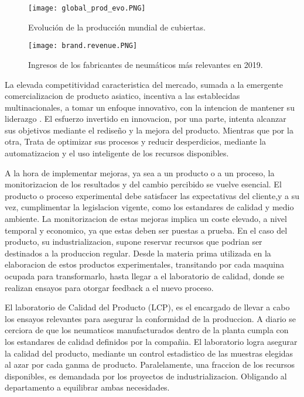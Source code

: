 \begin{figure}[h]
	\begin{center}
		\texttt{[image: global\_prod\_evo.PNG]}
	\end{center}
	\caption{Evolución de la producción mundial de cubiertas.}
	\label{fig:global_prod_evo}
\end{figure}

 \begin{figure}[h]
	\begin{center}
		\texttt{[image: brand.revenue.PNG]}
	\end{center}
	\caption{Ingresos de los fabricantes de neumáticos más relevantes en 2019.}
	\label{fig:brand_revenue}
\end{figure}

La elevada competitividad caracteristica del mercado,
sumada a la emergente comercializacion de producto asiatico,
incentiva a las establecidas multinacionales, a tomar un enfoque innovativo,
con la intencion de mantener su liderazgo \citep{chicu2020current}.
El esfuerzo invertido en innovacion,
por una parte, intenta alcanzar sus objetivos
mediante el rediseño y la mejora del producto.
Mientras que por la otra,
Trata de optimizar sus procesos y reducir desperdicios,
mediante la automatizacion y el uso inteligente de los recursos disponibles.

A la hora de implementar mejoras, ya sea a un producto o a un proceso,
la monitorizacion de los resultados y del cambio percibido se vuelve esencial.
El producto o proceso experimental debe satisfacer las expectativas del cliente,y a su vez, cumplimentar la legislacion vigente,
como los estandares de calidad y medio ambiente.
La monitorizacion de estas mejoras implica un coste elevado,
a nivel temporal y economico, ya que estas deben ser puestas a prueba.
En el caso del producto, su industrializacion,
supone reservar recursos que podrian ser destinados a la produccion regular.
Desde la materia prima utilizada
en la elaboracion de estos productos experimentales,
transitando por cada maquina ocupada para transformarlo,
hasta llegar a el laboratorio de calidad,
donde se realizan ensayos para otorgar feedback a el nuevo proceso.

El laboratorio de Calidad del Producto (LCP),
es el encargado de llevar a cabo los ensayos relevantes
para asegurar la conformidad de la produccion.
A diario se cerciora de que los neumaticos manufacturados dentro de la planta
cumpla con los estandares de calidad definidos por la compañia.
El laboratorio logra asegurar la calidad del producto,
mediante un control estadistico de las muestras
elegidas al azar por cada ganma de producto.
Paralelamente, una fraccion de los recursos disponibles,
es demandada por los proyectos de industrializacion.
Obligando al departamento a equilibrar ambas necesidades.

